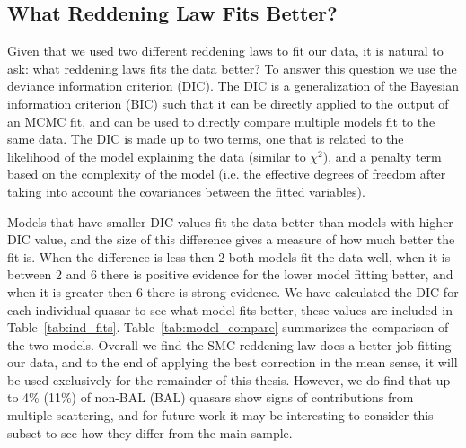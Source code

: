 
\subsection{What Reddening Law Fits Better?}\label{sec:DIC}

Given that we used two different reddening laws to fit our data, it is natural to ask: what reddening laws fits the data better?  To answer this question we use the deviance information criterion (DIC).  The DIC is a generalization of the Bayesian information criterion (BIC) such that it can be directly applied to the output of an MCMC fit, and can be used to directly compare multiple models fit to the same data.  The DIC is made up to two terms, one that is related to the likelihood of the model explaining the data (similar to $\chi^2$), and a penalty term based on the complexity of the model (i.e. the effective degrees of freedom after taking into account the covariances between the fitted variables).  

Models that have smaller DIC values fit the data better than models with higher DIC value, and the size of this difference gives a measure of how much better the fit is.  When the difference is less then 2 both models fit the data well, when it is between 2 and 6 there is positive evidence for the lower model fitting better, and when it is greater then 6 there is strong evidence.  We have calculated the DIC for each individual quasar to see what model fits better, these values are included in Table~\ref{tab:ind_fits}.  Table~\ref{tab:model_compare} summarizes the comparison of the two models.  Overall we find the SMC reddening law does a better job fitting our data, and to the end of applying the best correction in the mean sense, it will be used exclusively for the remainder of this thesis.  However, we do find that up to 4\% (11\%) of non-BAL (BAL) quasars show signs of contributions from multiple scattering, and for future work it may be interesting to consider this subset to see how they differ from the main sample.

